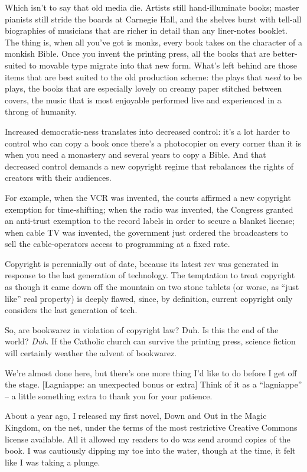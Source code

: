 Which isn't to say that old media die. Artists still
hand-illuminate books; master pianists still stride the boards at
Carnegie Hall, and the shelves burst with tell-all biographies of
musicians that are richer in detail than any liner-notes booklet.
The thing is, when all you've got is monks, every book takes on the
character of a monkish Bible. Once you invent the printing press,
all the books that are better-suited to movable type migrate into
that new form. What's left behind are those items that are best
suited to the old production scheme: the plays that \emph{need}
to be plays, the books that are especially lovely on creamy paper
stitched between covers, the music that is most enjoyable performed
live and experienced in a throng of humanity.

Increased democratic-ness translates into decreased control: it's a
lot harder to control who can copy a book once there's a
photocopier on every corner than it is when you need a monastery
and several years to copy a Bible. And that decreased control
demands a new copyright regime that rebalances the rights of
creators with their audiences.

For example, when the VCR was invented, the courts affirmed a new
copyright exemption for time-shifting; when the radio was invented,
the Congress granted an anti-trust exemption to the record labels
in order to secure a blanket license; when cable TV was invented,
the government just ordered the broadcasters to sell the
cable-operators access to programming at a fixed rate.

Copyright is perennially out of date, because its latest rev was
generated in response to the last generation of technology. The
temptation to treat copyright as though it came down off the
mountain on two stone tablets (or worse, as ``just like'' real
property) is deeply flawed, since, by definition, current copyright
only considers the last generation of tech.

So, are bookwarez in violation of copyright law? Duh. Is this the
end of the world? \emph{Duh}. If the Catholic church can survive
the printing press, science fiction will certainly weather the
advent of bookwarez.


We're almost done here, but there's one more thing I'd like to do
before I get off the stage. [Lagniappe: an unexpected bonus or
extra] Think of it as a ``lagniappe'' -- a little something extra to
thank you for your patience.

About a year ago, I released my first novel, Down and Out in the
Magic Kingdom, on the net, under the terms of the most restrictive
Creative Commons license available. All it allowed my readers to do
was send around copies of the book. I was cautiously dipping my toe
into the water, though at the time, it felt like I was taking a
plunge.

